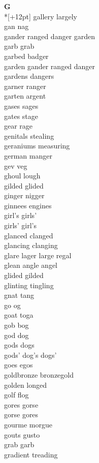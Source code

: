 \vspace{14pt}
\noindent\textbf{\Large G}\\*[+12pt]
gallery largely\\
gan nag\\
gander ranged danger garden\\
garb grab\\
garbed badger\\
garden gander ranged danger\\
gardens dangers\\
garner ranger\\
garten argent\\
gases sages\\
gates stage\\
gear rage\\
genitals stealing\\
geraniums measuring\\
german manger\\
gev veg\\
ghoul lough\\
gilded glided\\
ginger nigger\\
ginnees engines\\
girl's girls'\\
girls' girl's\\
glanced clanged\\
glancing clanging\\
glare lager large regal\\
glean angle angel\\
glided gilded\\
glinting tingling\\
gnat tang\\
go og\\
goat toga\\
gob bog\\
god dog\\
gods dogs\\
gods' dog's dogs'\\
goes egos\\
goldbronze bronzegold\\
golden longed\\
golf flog\\
gores gorse\\
gorse gores\\
gourme morgue\\
gouts gusto\\
grab garb\\
gradient treading\\
